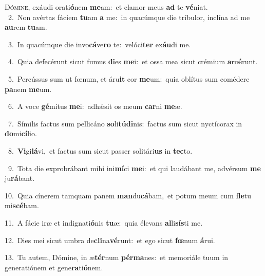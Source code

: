 \lettrine{\initial\textcolor{\initialcolor}{D}}{ómine,} exáudi orati\-\textbf{ó}\-nem \textbf{me}\-am:~\star et clamor meus \textbf{ad} te \textbf{vé}\-niat.\\
{\numbfont\textcolor{\numbcolor}{~2.}}~Non avértas fáciem \textbf{tu}\-am \textbf{a} me:~\star in quacúmque die tríbulor, inclína ad me \textbf{au}\-rem \textbf{tu}\-am.\par
{\numbfont\textcolor{\numbcolor}{~3.}}~In quacúmque die invo\-\textbf{cá}\-ve\textbf{ro} te:~\star velóci\textbf{ter} ex\-\textbf{áu}\-di me.\par
{\numbfont\textcolor{\numbcolor}{~4.}}~Quia defecérunt sicut fumus \textbf{di}\-es \textbf{me}\-i:~\star et ossa mea sicut crémium \textbf{a}\-ru\-\textbf{é}\-runt.\par
{\numbfont\textcolor{\numbcolor}{~5.}}~Percússus sum ut fœnum, et áru\textbf{it} cor \textbf{me}\-um:~\star quia oblítus sum comédere \textbf{pa}\-nem \textbf{me}\-um.\par
{\numbfont\textcolor{\numbcolor}{~6.}}~A voce \textbf{gé}\-mitus \textbf{me}\-i:~\star adhǽsit os meum \textbf{car}\-ni \textbf{me}\-æ.\par
{\numbfont\textcolor{\numbcolor}{~7.}}~Símilis factus sum pellicáno \textbf{so}\-li\-\textbf{tú}\-\textbf{di}nis:~\star factus sum sicut nyctícorax in \textbf{do}\-mi\-\textbf{cí}\-lio.\par
{\numbfont\textcolor{\numbcolor}{~8.}}~\-\textbf{Vi}\-gi\-\textbf{lá}\-vi,~\star et factus sum sicut passer solitári\textbf{us} in \textbf{tec}\-to.\par
{\numbfont\textcolor{\numbcolor}{~9.}}~Tota die exprobrábant mihi ini\-\textbf{mí}\-ci \textbf{me}\-i:~\star et qui laudábant me, advérsum \textbf{me} ju\-\textbf{rá}\-bant.\par
{\numbfont\textcolor{\numbcolor}{10.}}~Quia cínerem tamquam panem \textbf{man}\-du\-\textbf{cá}\-bam,~\star et potum meum cum \textbf{fle}\-tu mi\-\textbf{scé}\-bam.\par
{\numbfont\textcolor{\numbcolor}{11.}}~A fácie iræ et indignati\-\textbf{ó}\-nis \textbf{tu}\-æ:~\star quia élevans \textbf{al}\-li\-\textbf{sís}\-ti me.\par
{\numbfont\textcolor{\numbcolor}{12.}}~Dies mei sicut umbra de\-\textbf{cli}\-na\-\textbf{vé}\-runt:~\star et ego sicut \textbf{fœ}\-num \textbf{á}\-rui.\par
{\numbfont\textcolor{\numbcolor}{13.}}~Tu autem, Dómine, in æ\-\textbf{tér}\-num \textbf{pér}\-\textbf{ma}nes:~\star et memoriále tuum in generatiónem et gene\-\textbf{ra}\-ti\-\textbf{ó}\-nem.\par
